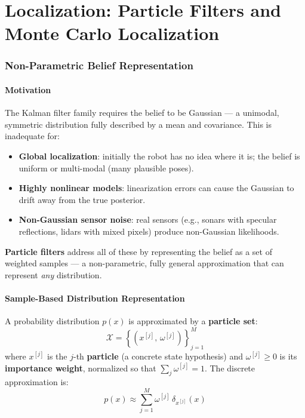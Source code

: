 \documentclass[11pt,a4paper]{article}
\theoremstyle{definition}
\theoremstyle{plain}
\theoremstyle{remark}
\begin{document}
\part{Localization: Particle Filters and Monte Carlo Localization}

\section{Non-Parametric Belief Representation}

\subsection{Motivation}

The Kalman filter family requires the belief to be Gaussian — a unimodal, symmetric distribution fully described by a mean and covariance. This is inadequate for:
\begin{itemize}
    \item \textbf{Global localization}: initially the robot has no idea where it is; the belief is uniform or multi-modal (many plausible poses).
    \item \textbf{Highly nonlinear models}: linearization errors can cause the Gaussian to drift away from the true posterior.
    \item \textbf{Non-Gaussian sensor noise}: real sensors (e.g., sonars with specular reflections, lidars with mixed pixels) produce non-Gaussian likelihoods.
\end{itemize}

\textbf{Particle filters} address all of these by representing the belief as a set of weighted samples — a non-parametric, fully general approximation that can represent \textit{any} distribution.

\subsection{Sample-Based Distribution Representation}

A probability distribution $p(x)$ is approximated by a \textbf{particle set}:
\[
\mathcal{X} = \left\{\left(x^{[j]},\, \omega^{[j]}\right)\right\}_{j=1}^{M} %
\]
where $x^{[j]}$ is the $j$-th \textbf{particle} (a concrete state hypothesis) and $\omega^{[j]} \geq 0$ is its \textbf{importance weight}, normalized so that $\sum_j \omega^{[j]} = 1$. The discrete approximation is:
\[
p(x) \approx \sum_{j=1}^{M} \omega^{[j]}\,\delta_{x^{[j]}}(x)
\]
\end{document}
